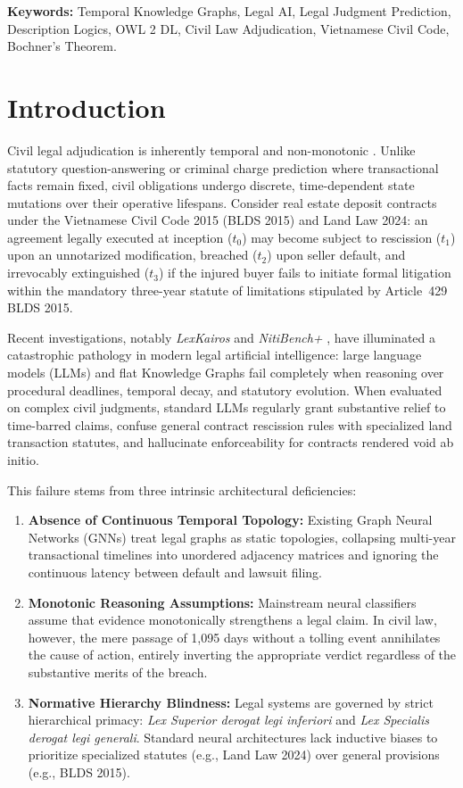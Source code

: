 \documentclass[11pt,a4paper]{article}
\begin{document}
\noindent\textbf{Keywords:} Temporal Knowledge Graphs, Legal AI, Legal Judgment Prediction, Description Logics, OWL 2 DL, Civil Law Adjudication, Vietnamese Civil Code, Bochner's Theorem.

\section{Introduction}
\label{sec:intro}
Civil legal adjudication is inherently temporal and non-monotonic \citep{hogan2021knowledge, prakken2002law}. Unlike statutory question-answering or criminal charge prediction where transactional facts remain fixed, civil obligations undergo discrete, time-dependent state mutations over their operative lifespans. Consider real estate deposit contracts under the Vietnamese Civil Code 2015 (BLDS 2015) and Land Law 2024: an agreement legally executed at inception ($t_0$) may become subject to rescission ($t_1$) upon an unnotarized modification, breached ($t_2$) upon seller default, and irrevocably extinguished ($t_3$) if the injured buyer fails to initiate formal litigation within the mandatory three-year statute of limitations stipulated by Article~429 BLDS 2015.

Recent investigations, notably \textit{LexKairos} \citep{oxford2026lexkairos} and \textit{NitiBench+} \citep{nitibench2026}, have illuminated a catastrophic pathology in modern legal artificial intelligence: large language models (LLMs) and flat Knowledge Graphs fail completely when reasoning over procedural deadlines, temporal decay, and statutory evolution. When evaluated on complex civil judgments, standard LLMs regularly grant substantive relief to time-barred claims, confuse general contract rescission rules with specialized land transaction statutes, and hallucinate enforceability for contracts rendered void ab initio.

This failure stems from three intrinsic architectural deficiencies:
\begin{enumerate}[label=(\roman*)]
    \item \textbf{Absence of Continuous Temporal Topology:} Existing Graph Neural Networks (GNNs) \citep{kipf2017semi, velickovic2018graph} treat legal graphs as static topologies, collapsing multi-year transactional timelines into unordered adjacency matrices and ignoring the continuous latency between default and lawsuit filing.
    \item \textbf{Monotonic Reasoning Assumptions:} Mainstream neural classifiers assume that evidence monotonically strengthens a legal claim. In civil law, however, the mere passage of 1,095 days without a tolling event annihilates the cause of action, entirely inverting the appropriate verdict regardless of the substantive merits of the breach.
    \item \textbf{Normative Hierarchy Blindness:} Legal systems are governed by strict hierarchical primacy: \textit{Lex Superior derogat legi inferiori} and \textit{Lex Specialis derogat legi generali}. Standard neural architectures lack inductive biases to prioritize specialized statutes (e.g., Land Law 2024) over general provisions (e.g., BLDS 2015).
\end{enumerate}
\end{document}
